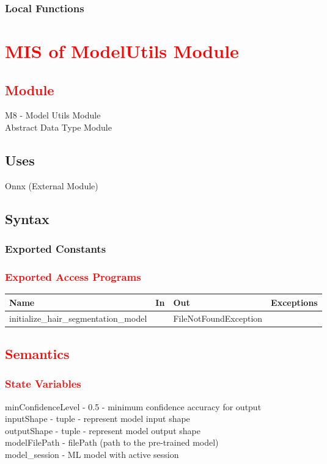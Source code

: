 \documentclass[12pt, titlepage]{article}
\begin{document}
\subsubsection{Local Functions}

\color{black}
\section{\textcolor{red}{MIS of ModelUtils Module}}
\subsection{\textcolor{red}{Module}}
M8 - Model Utils Module\\
Abstract Data Type Module

\subsection{Uses}
Onnx (External Module) \\

\subsection{Syntax}

\subsubsection{Exported Constants}

\subsubsection{\textcolor{red}{Exported Access Programs}}

\begin{center}
\begin{tabular}{p{4cm} p{3cm} p{4cm} p{4cm}}
\hline
\textbf{Name} & \textbf{In} & \textbf{Out} & \textbf{Exceptions} \\
\hline
initialize\_hair\_segmentation\_model & & FileNotFoundException & \\
\hline
\end{tabular}
\end{center}

\subsection{\textcolor{red}{Semantics}}

\subsubsection{\textcolor{red}{State Variables}}
minConfidenceLevel - 0.5 - minimum confidence accuracy for output \\
inputShape - tuple - represent model input shape \\
outputShape - tuple - represent model output shape \\
modelFilePath - filePath (path to the pre-trained model) \\
model\_session - ML model with active session
\end{document}
